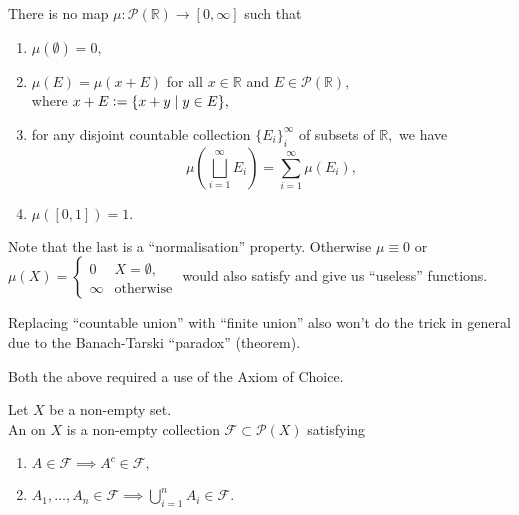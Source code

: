 \documentclass[12pt]{article}	%
\begin{document}
\coverpage

\updated{\today}

\thispagestyle{empty}
\tableofcontents
\newpage
\pagestyle{fancy}
\setcounter{page}{1}

\section{} %

\begin{thm}
	There is no map $\mu : \mathcal{P}(\mathbb{R}) \to [0, \infty]$ such that
	\begin{enumerate}
		\item $\mu(\emptyset) = 0,$
		\item $\mu(E) = \mu(x + E)$ for all $x \in \mathbb{R}$ and $E \in \mathcal{P}(\mathbb{R}),$\\
		where $x + E \vcentcolon= \{x + y \mid y \in E\},$
		\item for any disjoint countable collection $\{E_i\}_{i}^{\infty}$ of subsets of $\mathbb{R},$ we have
		\begin{equation*} 
			\mu\left(\bigsqcup_{i = 1}^\infty E_i\right) = \sum_{i = 1}^{\infty} \mu(E_i),
		\end{equation*}
		\item $\mu([0, 1]) = 1.$
	\end{enumerate}
\end{thm}
Note that the last is a ``normalisation'' property. Otherwise $\mu \equiv 0$ or $\mu(X) = \begin{cases}
	0 & X = \emptyset,\\
	\infty & \text{otherwise}
\end{cases}$ would also satisfy and give us ``useless'' functions.

Replacing ``countable union'' with ``finite union'' also won't do the trick in general due to the Banach-Tarski ``paradox'' (theorem).

Both the above required a use of the Axiom of Choice.

\begin{defn}[Algebra]
	Let $X$ be a non-empty set.\\
	An  on $X$ is a non-empty collection $\mathcal{F} \subset \mathcal{P}(X)$ satisfying
	\begin{enumerate}
		\item $A \in \mathcal{F} \implies A^c \in \mathcal{F},$
		\item $A_1, \ldots, A_n \in \mathcal{F} \implies \bigcup_{i = 1}^nA_i \in \mathcal{F}.$
	\end{enumerate}
\end{defn}
\end{document}
